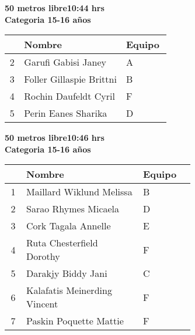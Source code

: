 \begin{minipage}{0.95\linewidth}\vspace{0.5cm} 
\begin{flushleft}
\textbf{
\hspace{-0.15cm}50 metros libre\hspace{1.5cm}10:44 hrs \\Categoria 15-16 años}\vspace{-0.2cm} 
\end{flushleft}
\begin{tabular}{cp{0.63\linewidth}l}
\hline
& \textbf{Nombre} & \textbf{Equipo} \\ \hline
2 & Garufi Gabisi Janey & A \\ 
3 & Foller Gillaspie Brittni & B \\ 
4 & Rochin Daufeldt Cyril & F \\ 
5 & Perin Eanes Sharika & D \\ 
\end{tabular}
\end{minipage}
\begin{minipage}{0.95\linewidth}\vspace{0.5cm} 
\begin{flushleft}
\textbf{
\hspace{-0.15cm}50 metros libre\hspace{1.5cm}10:46 hrs \\Categoria 15-16 años}\vspace{-0.2cm} 
\end{flushleft}
\begin{tabular}{cp{0.63\linewidth}l}
\hline
& \textbf{Nombre} & \textbf{Equipo} \\ \hline
1 & Maillard Wiklund Melissa & B \\ 
2 & Sarao Rhymes Micaela & D \\ 
3 & Cork Tagala Annelle & E \\ 
4 & Ruta Chesterfield Dorothy & F \\ 
5 & Darakjy Biddy Jani & C \\ 
6 & Kalafatis Meinerding Vincent & F \\ 
7 & Paskin Poquette Mattie & F \\ 
\end{tabular}
\end{minipage}
